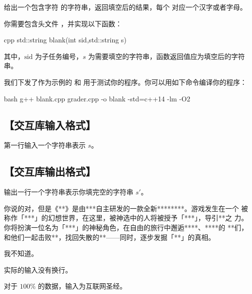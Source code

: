 \documentclass{oicontest}
\begin{document}
给出一个包含字符 \ttstring{*} 的字符串，返回填空后的结果，每个 \ttstring{*} 对应一个汉字或者字母。

\implement


你需要包含头文件 ，并实现以下函数：

\begin{code}{cpp}
std::string blank(int sid,std::string s)
\end{code}

其中，$\mathrm{sid}$ 为子任务编号，$s$ 为需要填空的字符串，函数返回值应为填空后的字符串。

我们下发了作为示例的  和  用于测试你的程序。你可以用如下命令编译你的程序：

\begin{code}{bash}
g++ blank.cpp grader.cpp -o blank -std=c++14 -lm -O2
\end{code}


\subsection[交互库输入格式]{【交互库输入格式】}

第一行输入一个字符串表示 $s$。

\subsection[交互库输出格式]{【交互库输出格式】}

输出一行一个字符串表示你填完空的字符串 $s'$。

\begin{example}
你说的对，但是《**》是由***自主研发的一款全新********。游戏发生在一个
被称作「***」的幻想世界，在这里，被神选中的人将被授予「***」，导引**之
力。你将扮演一位名为「***」的神秘角色，在自由的旅行中邂逅****、****的
**们，和他们一起击败**，找回失散的**——同时，逐步发掘「**」的真相。
\end{example}

我不知道。


实际的输入没有换行。

\constraints

对于 $100\%$ 的数据，输入为互联网圣经。
\end{document}
